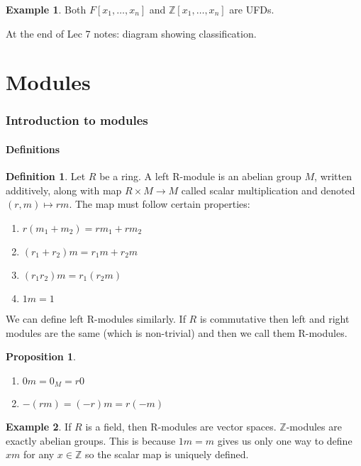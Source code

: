 \documentclass{article}
\newcommand\Z{\ensuremath{\mathbb{Z}}}
\theoremstyle{definition}
\newtheorem{definition}{Definition}[subsection]
\newtheorem{eg}{Example}[subsection]
\theoremstyle{remark}
\theoremstyle{plain}
\newtheorem{prop}{Proposition}[subsection]
\begin{document}
\begin{eg}
    Both \(F[x_1, \ldots, x_n]\) and \(\Z[x_1, \ldots, x_n]\) are UFDs.
\end{eg}

At the end of Lec 7 notes: diagram showing classification.

\newpage

\part{Modules}
\section{Introduction to modules}
\subsection{Definitions}

\begin{definition}
    Let \(R\) be a ring. A left R-module is an abelian group \(M\), written additively, along with map \(R\times M \to M\) called scalar
    multiplication and denoted \((r,m)\mapsto rm\). The map must follow certain properties:
    \begin{enumerate}
        \item \(r(m_1 + m_2) = rm_1 + rm_2\)
        \item \((r_1 + r_2)m = r_1m + r_2m\)
        \item \((r_1r_2)m = r_1(r_2m)\)
        \item \(1m = 1\)
    \end{enumerate}
\end{definition}

We can define left R-modules similarly. If \(R\) is commutative then left and right modules are the same (which is non-trivial) and then we
call them R-modules. 

\begin{prop}
    \begin{enumerate}
        \item \(0m = 0_M = r0\)
        \item \(-(rm) = (-r)m = r(-m)\)
    \end{enumerate}
\end{prop}

\begin{eg}
    If \(R\) is a field, then R-modules are vector spaces. \(\Z\)-modules are exactly abelian groups.
    This is because \(1m = m\) gives us only one way to define \(xm\) for any \(x \in \Z\) so the scalar map
    is uniquely defined. 
\end{eg}
\end{document}
